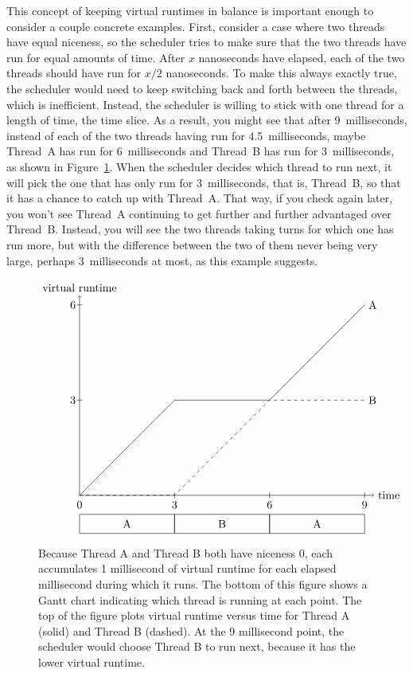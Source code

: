 This concept of keeping virtual runtimes in balance is important enough
to consider a couple concrete examples.
First, consider a case where two threads have equal niceness, so the scheduler tries to make
sure that the two threads have run for equal amounts of time. After $x$
nanoseconds have elapsed, each of the two threads should have run for $x/2$
nanoseconds.  To make this always exactly true, the scheduler would need to
keep switching back and forth between the threads, which is inefficient.  Instead, the scheduler is willing to stick with one thread for a length of
time, the time slice.  As a result, you might see that after 9~milliseconds,
instead of each of the two threads having run for 4.5~milliseconds, maybe
Thread~A has run for 6~milliseconds and Thread~B has run for 3~milliseconds,
as shown in Figure~\ref{equal-virtual-runtime-figure}.  When the scheduler decides which thread to run next, it
will pick the one that has only run for 3~milliseconds, that is, Thread~B,
so that it has a chance to catch up with Thread~A.  That way, if you check
again later, you won't see Thread~A continuing to get further and further
advantaged over Thread~B.  Instead, you will see the two threads taking
turns for which one has run more, but with the difference between the two of
them never being very large, perhaps 3~milliseconds at most, as this
example suggests.
\begin{figure}
\[\begin{tikzpicture}[scale=.03]
\draw (0,0) rectangle (100,20);
\draw (100,0) rectangle (200,20);
\draw (200,0) rectangle (300,20);
\draw (50,10) node{A};
\draw (150,10) node{B};
\draw (250,10) node{A};
\draw (0,30) node{0};
\draw (100,30) node{3};
\draw (100,37) -- (100,43);
\draw (200,30) node{6};
\draw (200,37) -- (200,43);
\draw (300,30) node{9};
\draw (300,37) -- (300,43);
\draw[->] (0,40) -- (310,40) node[right] {time};
\draw[->] (0,40) -- (0,250) node[above] {virtual runtime};
\draw (0,40) -- (100,140) -- (200,140) -- (300, 240) node[right] {A};
\draw[dashed] (0,40) -- (100,40) -- (200,140) -- (300, 140) node[right] {B};
\draw (-7,140) node{3};
\draw (-3,140) -- (3,140);
\draw (-7,240) node{6};
\draw (-3,240) -- (3,240);
\end{tikzpicture}\]
\caption{Because Thread A and Thread B both have niceness 0, each accumulates 1 millisecond of virtual
runtime for each elapsed millisecond during which it runs.  The bottom of this figure shows a Gantt
chart indicating which thread is running at each point.  The top of the figure plots virtual runtime versus time
for Thread A (solid) and Thread B (dashed). At the 9 millisecond point, the scheduler would choose
Thread B to run next, because it has the lower virtual runtime.}\label{equal-virtual-runtime-figure}
\end{figure}


